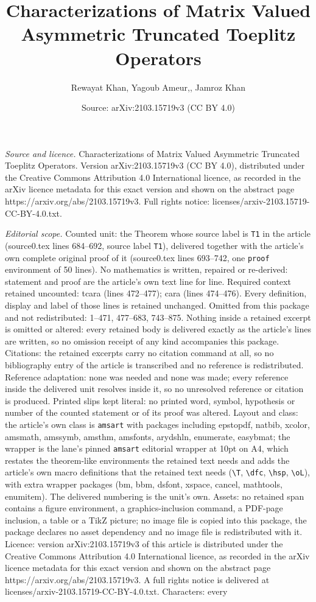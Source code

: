 \documentclass[10pt,a4paper]{amsart}
\title[Characterizations of Matrix Valued Asymmetric Truncated Toep]{Characterizations of Matrix Valued Asymmetric Truncated Toeplitz Operators}
\author{Rewayat Khan, Yagoub Ameur,, Jamroz Khan}
\date{Source: arXiv:2103.15719v3 (CC BY 4.0)}
\begin{document}
\maketitle

\noindent\emph{Source and licence.} Characterizations of Matrix Valued Asymmetric Truncated Toeplitz Operators. Version arXiv:2103.15719v3 (CC BY 4.0), distributed under the Creative Commons Attribution 4.0 International licence, as recorded in the arXiv licence metadata for this exact version and shown on the abstract page https://arxiv.org/abs/2103.15719v3. Full rights notice: licenses/arxiv-2103.15719-CC-BY-4.0.txt.\par\smallskip

\noindent\textit{Editorial scope.} Counted unit: the Theorem whose source label is \texttt{T1} in the article (source0.tex lines 684--692, source label \texttt{T1}), delivered together with the article's own complete original proof of it (source0.tex lines 693--742, one \texttt{proof} environment of 50 lines). No mathematics is written, repaired or re-derived: statement and proof are the article's own text line for line. Required context retained uncounted: tcara (lines 472--477); cara (lines 474--476). Every definition, display and label of those lines is retained unchanged. Omitted from this package and not redistributed: 1--471, 477--683, 743--875. Nothing inside a retained excerpt is omitted or altered: every retained body is delivered exactly as the article's lines are written, so no omission receipt of any kind accompanies this package. Citations: the retained excerpts carry no citation command at all, so no bibliography entry of the article is transcribed and no reference is redistributed. Reference adaptation: none was needed and none was made; every reference inside the delivered unit resolves inside it, so no unresolved reference or citation is produced. Printed slips kept literal: no printed word, symbol, hypothesis or number of the counted statement or of its proof was altered. Layout and class: the article's own class is \texttt{amsart} with packages including epstopdf, natbib, xcolor, amsmath, amssymb, amsthm, amsfonts, arydshln, enumerate, easybmat; the wrapper is the lane's pinned \texttt{amsart} editorial wrapper at 10pt on A4, which restates the theorem-like environments the retained text needs and adds the article's own macro definitions that the retained text needs (\texttt{\textbackslash T}, \texttt{\textbackslash dfc}, \texttt{\textbackslash hsp}, \texttt{\textbackslash oL}), with extra wrapper packages (bm, bbm, dsfont, xspace, cancel, mathtools, enumitem). The delivered numbering is the unit's own. Assets: no retained span contains a figure environment, a graphics-inclusion command, a PDF-page inclusion, a table or a TikZ picture; no image file is copied into this package, the package declares no asset dependency and no image file is redistributed with it. Licence: version arXiv:2103.15719v3 of this article is distributed under the Creative Commons Attribution 4.0 International licence, as recorded in the arXiv licence metadata for this exact version and shown on the abstract page https://arxiv.org/abs/2103.15719v3. A full rights notice is delivered at licenses/arxiv-2103.15719-CC-BY-4.0.txt. Characters: every 
\end{document}
